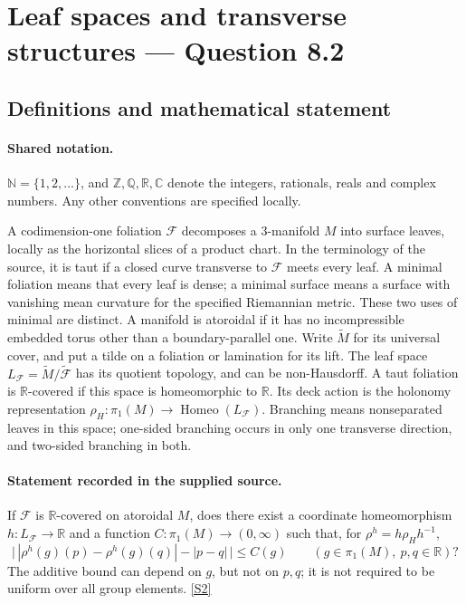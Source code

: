 \documentclass[11pt]{article}
\newcommand{\sref}[2]{\hyperlink{source:#1:#2}{[S#2]}}
\begin{document}
\section{Leaf spaces and transverse structures — Question 8.2}\label{statement}

\subsection{Definitions and mathematical statement}

\paragraph{Shared notation.}$\mathbb N=\{1,2,\ldots\}$, and $\mathbb Z,\mathbb Q,\mathbb R,\mathbb C$ denote the integers, rationals, reals and complex numbers. Any other conventions are specified locally.


A codimension-one foliation $\mathcal F$ decomposes a $3$-manifold $M$ into surface leaves, locally as the horizontal slices of a product chart. In the terminology of the source, it is taut if a closed curve transverse to $\mathcal F$ meets every leaf. A minimal foliation means that every leaf is dense; a minimal surface means a surface with vanishing mean curvature for the specified Riemannian metric. These two uses of minimal are distinct. A manifold is atoroidal if it has no incompressible embedded torus other than a boundary-parallel one. Write $\widetilde M$ for its universal cover, and put a tilde on a foliation or lamination for its lift. The leaf space $L_{\mathcal F}=\widetilde M/\widetilde{\mathcal F}$ has its quotient topology, and can be non-Hausdorff. A taut foliation is $\mathbb R$-covered if this space is homeomorphic to $\mathbb R$. Its deck action is the holonomy representation $\rho_H:\pi_1(M)\longrightarrow\operatorname{Homeo}(L_{\mathcal F})$. Branching means nonseparated leaves in this space; one-sided branching occurs in only one transverse direction, and two-sided branching in both.
\paragraph{Statement recorded in the supplied source.}
If $\mathcal F$ is $\mathbb R$-covered on atoroidal $M$, does there exist a coordinate homeomorphism $h:L_{\mathcal F}\to\mathbb R$ and a function $C:\pi_1(M)\to(0,\infty)$ such that, for $\rho^h=h\rho_Hh^{-1}$,
\[\bigl|\,|\rho^h(g)(p)-\rho^h(g)(q)|-|p-q|\,\bigr|\le C(g)\qquad(g\in\pi_1(M),\ p,q\in\mathbb R)?\]
The additive bound can depend on $g$, but not on $p,q$; it is not required to be uniform over all group elements. \sref{statement}{2}
\end{document}
